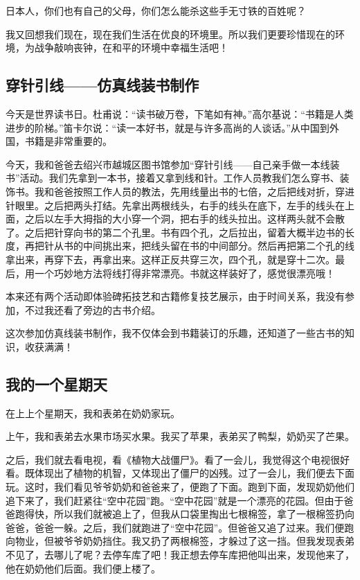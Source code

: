 \documentclass[UTF8,a4paper,titlepage,twoside,10.5pt]{article}
\begin{document}
日本人，你们也有自己的父母，你们怎么能杀这些手无寸铁的百姓呢？

我又回想我们现在，现在我们生活在优良的环境里。所以我们更要珍惜现在的环境，为战争敲响丧钟，在和平的环境中幸福生活吧！

\subsection{穿针引线——仿真线装书制作}
\label{sec:org59b740d}

今天是世界读书日。杜甫说：“读书破万卷，下笔如有神。”高尔基说：“书籍是人类进步的阶梯。”笛卡尔说：“读一本好书，就是与许多高尚的人谈话。”从中国到外国，书籍是非常重要的。

今天，我和爸爸去绍兴市越城区图书馆参加“穿针引线——自己亲手做一本线装书”活动。我们先拿到一本书，接着又拿到线和针。工作人员教我们怎么穿书、装饰书。我和爸爸按照工作人员的教法，先用线量出书的七倍，之后把线对折，穿进针眼里。之后把两头打结。先拿出两根线头，右手的线头在底下，左手的线头在上面，之后以左手大拇指的大小穿一个洞，把右手的线头拉出。这样两头就不会散了。之后把针穿向书的第二个孔里。书有四个孔，之后拉出，留着大概半边书的长度，再把针从书的中间挑出来，把线头留在书的中间部分。然后再把第二个孔的线拿出来，再穿下去，再拿出来。这样正反共穿三次，四个孔，就是穿十二次。最后，用一个巧妙地方法将线打得非常漂亮。书就这样装好了，感觉很漂亮哦！

本来还有两个活动即体验碑拓技艺和古籍修复技艺展示，由于时间关系，我没有参加，不过我还看了旁边的古书介绍。

这次参加仿真线装书制作，我不仅体会到书籍装订的乐趣，还知道了一些古书的知识，收获满满！

\subsection{我的一个星期天}
\label{sec:org4a18a7a}

在上上个星期天，我和表弟在奶奶家玩。

上午，我和表弟去水果市场买水果。我买了苹果，表弟买了鸭梨，奶奶买了芒果。

之后，我们就去看电视，看《植物大战僵尸》。看了一会儿，我觉得这个电视很好看。既体现出了植物的机智，又体现出了僵尸的凶残。过了一会儿，我们便去下面玩。这时，我们看见爷爷奶奶和爸爸来了，便跑了下面。跑到下面，发现奶奶他们追下来了，我们赶紧往“空中花园”跑。“空中花园”就是一个漂亮的花园。但由于爸爸跑得快，所以我们就被追上了，但我从口袋里掏出七根棉签，拿了一根棉签扔向爸爸，爸爸一躲。之后，我们就跑进了“空中花园”。但爸爸又追了过来。我们便跑向物业，但被爷爷奶奶挡住。我又扔了两根棉签，才躲过了这一挡。但我发现表弟不见了，去哪儿了呢？去停车库了吧！我正想去停车库把他叫出来，发现他来了，他在奶奶他们后面。我们便上楼了。
\end{document}
